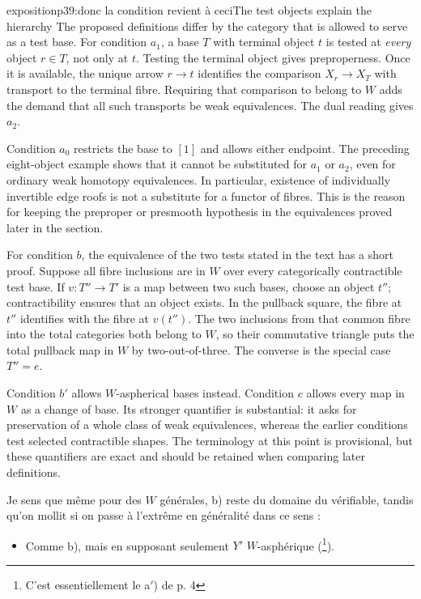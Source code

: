 \begin{dcomment}{exposition}{p39:donc la condition revient à ceci}{The test objects explain the hierarchy}
The proposed definitions differ by the category that is allowed to serve as a test base. For condition $a_1$, a base $T$ with terminal object $t$ is tested at \emph{every} object $r\in T$, not only at $t$. Testing the terminal object gives preproperness. Once it is available, the unique arrow $r\to t$ identifies the comparison $X_r\to X_T$ with transport to the terminal fibre. Requiring that comparison to belong to $W$ adds the demand that all such transports be weak equivalences. The dual reading gives $a_2$.

Condition $a_0$ restricts the base to $[1]$ and allows either endpoint. The preceding eight-object example shows that it cannot be substituted for $a_1$ or $a_2$, even for ordinary weak homotopy equivalences. In particular, existence of individually invertible edge roofs is not a substitute for a functor of fibres. This is the reason for keeping the preproper or presmooth hypothesis in the equivalences proved later in the section.

For condition $b$, the equivalence of the two tests stated in the text has a short proof. Suppose all fibre inclusions are in $W$ over every categorically contractible test base. If $v:T''\to T'$ is a map between two such bases, choose an object $t''$; contractibility ensures that an object exists. In the pullback square, the fibre at $t''$ identifies with the fibre at $v(t'')$. The two inclusions from that common fibre into the total categories both belong to $W$, so their commutative triangle puts the total pullback map in $W$ by two-out-of-three. The converse is the special case $T''=e$.

Condition $b'$ allows $W$-aspherical bases instead. Condition $c$ allows every map in $W$ as a change of base. Its stronger quantifier is substantial: it asks for preservation of a whole class of weak equivalences, whereas the earlier conditions test selected contractible shapes. The terminology at this point is provisional, but these quantifiers are exact and should be retained when comparing later definitions.
\end{dcomment}


Je sens que même pour des $W$ générales, b) reste du domaine du vérifiable, tandis qu'on mollit si on passe à l'extrême en généralité dans ce sens :

\begin{itemize}
\item[b$'$)] Comme b), mais en supposant seulement $Y'$ $W$-asphérique (\footnote[47]{C'est essentiellement le a$'$) de p. 4}).
\end{itemize}

